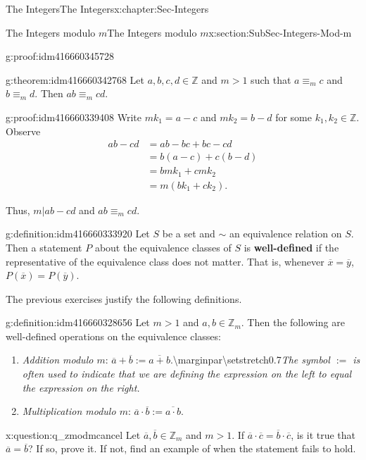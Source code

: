 \documentclass[oneside,10pt,]{book}
\newcommand{\terminology}[1]{\textbf{#1}}
\numberwithin{equation}{section}
\def\Z{{\mathbb Z}}
\newcommand{\amp}{&}
\begin{document}
\begin{chapterptx}{The Integers}{}{The Integers}{}{}{x:chapter:Sec-Integers}
\begin{sectionptx}{The Integers modulo \(m\)}{}{The Integers modulo \(m\)}{}{}{x:section:SubSec-Integers-Mod-m}
\begin{proofptx}{}{g:proof:idm416660345728}
\end{proofptx}
\begin{theorem}{}{}{g:theorem:idm416660342768}%
Let \(a,b, c,d\in \Z\) and \(m > 1\) such that \(a\equiv_m c\) and \(b\equiv_m d\). Then \(ab \equiv_m c d\).%
\end{theorem}
\begin{proofptx}{}{g:proof:idm416660339408}
Write \(mk_1 = a-c\) and \(m k_2 = b-d\) for some \(k_1,k_2\in \Z\). Observe%
\begin{align*}
ab -cd \amp = ab - bc + bc - cd\\
\amp = b(a-c) + c(b-d)\\
\amp = bmk_1 + cmk_2\\
\amp = m(bk_1 + ck_2)\text{.}
\end{align*}
%
\par
Thus, \(m|ab-cd\) and \(ab \equiv_m cd\).%
\end{proofptx}
\begin{definition}{}{g:definition:idm416660333920}%
Let \(S\) be a set and \(\sim\) an equivalence relation on \(S\). Then a statement \(P\) about the equivalence classes of \(S\) is \terminology{well-defined} if the representative of the equivalence class does not matter. That is, whenever \(\overline{x} = \overline{y}\), \(P(\overline{x}) = P(\overline{y})\).%
\end{definition}
The previous exercises justify the following definitions.%
\begin{definition}{}{g:definition:idm416660328656}%
Let \(m > 1\) and \(a,b\in \Z_m\). Then the following are well-defined operations on the equivalence classes:%
\begin{enumerate}
\item{}\emph{Addition modulo \(m\)}: \(\overline{a} + \overline{b} := \overline{a+b}\).\textbackslash{}marginpar\textbraceleft{}\textbackslash{}setstretch\textbraceleft{}0.7\textbraceright{}\emph{The symbol \(:=\) is often used to indicate that we are \emph{defining} the expression on the left to equal the expression on the right.}\textbraceright{}%
\item{}\emph{Multiplication modulo \(m\)}: \(\overline{a}\cdot \overline{b} := \overline{a\cdot b}\).%
\end{enumerate}
%
\end{definition}
\begin{question}{}{x:question:q_zmodmcancel}%
Let \(\overline{a},\overline{b}\in \Z_m\) and \(m > 1\). If \(\overline{a}\cdot \overline{c} = \overline{b}\cdot \overline{c}\), is it true that \(\overline{a} = \overline{b}\)? If so, prove it. If not, find an example of when the statement fails to hold.%

\end{question}
\end{sectionptx}
\end{chapterptx}
\end{document}
